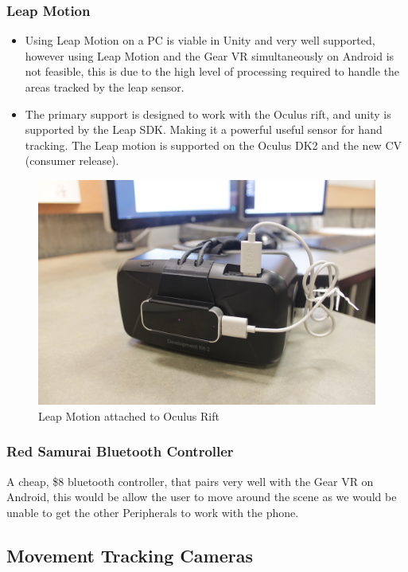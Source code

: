 \documentclass[a4paper,10pt]{article}
\begin{document}
\subsubsection{Leap Motion}
\begin{itemize}
	\item Using Leap Motion on a PC is viable in Unity and very well supported, however using Leap Motion and the Gear VR simultaneously on Android is not feasible, this is due to the high level of processing required to
	handle the areas tracked by the leap sensor. 
	\item The primary support is designed to work with the Oculus rift, and unity is supported by the Leap SDK. Making it a powerful useful sensor for hand tracking. The 
	Leap motion is supported on the Oculus DK2 and the new CV (consumer release). 
\end{itemize}
\begin{figure}[H]
	\centerline{\includegraphics[scale= 0.08]{leap.jpg}}
	\caption{Leap Motion attached to Oculus Rift}
	\label{fig:leapImg}
\end{figure}
	
\subsubsection{Red Samurai Bluetooth Controller}
	A cheap, \$8 bluetooth controller, that pairs very well with the Gear VR on Android, this would be allow the user to move around the scene as we would be unable to get the other Peripherals to work with the phone.
\pagebreak
\subsection{Movement Tracking Cameras}
\end{document}
